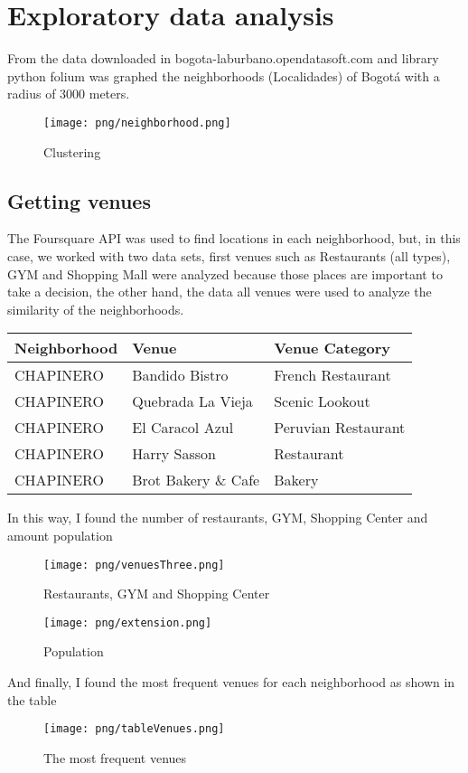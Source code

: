 {\justifying
	\chapter{Exploratory data analysis}
	\vspace{2.5cm}
	From the data downloaded in bogota-laburbano.opendatasoft.com and library python folium was graphed the neighborhoods (Localidades) of Bogotá  with a radius of 3000 meters.
	\begin{figure}[H]
		\centering
		\texttt{[image: png/neighborhood.png]}
		\caption{Clustering}
	\end{figure}
	\section{Getting venues}
	The Foursquare API was used to find locations in each neighborhood, but, in this case, we worked with two data sets, first venues such as Restaurants (all types), GYM and Shopping Mall were analyzed because those places are important to take a decision, the other hand, the data all venues were used to analyze the similarity of the neighborhoods.
	\begin{center}
		\begin{tabular}{lll}
			\toprule
			Neighborhood &              Venue &      Venue Category \\
			\midrule
			CHAPINERO &     Bandido Bistro &   French Restaurant \\
			CHAPINERO &  Quebrada La Vieja &      Scenic Lookout \\
			CHAPINERO &    El Caracol Azul & Peruvian Restaurant \\
			CHAPINERO &       Harry Sasson &          Restaurant \\
			CHAPINERO & Brot Bakery \& Cafe &              Bakery \\
			\bottomrule
		\end{tabular}
	\end{center}
	In this way, I found the number of restaurants, GYM, Shopping Center and amount population
	\begin{figure}[H]
		\centering
		\texttt{[image: png/venuesThree.png]}
		\caption{Restaurants, GYM and Shopping Center}
	\end{figure}
	\begin{figure}[H]
		\centering
		\texttt{[image: png/extension.png]}
		\caption{Population}
	\end{figure}
	And finally, I found the most frequent venues for each neighborhood as shown in the table
	\begin{figure}[H]
		\centering
		\texttt{[image: png/tableVenues.png]}
		\caption{The most frequent venues}
	\end{figure}
}\cleanalldata